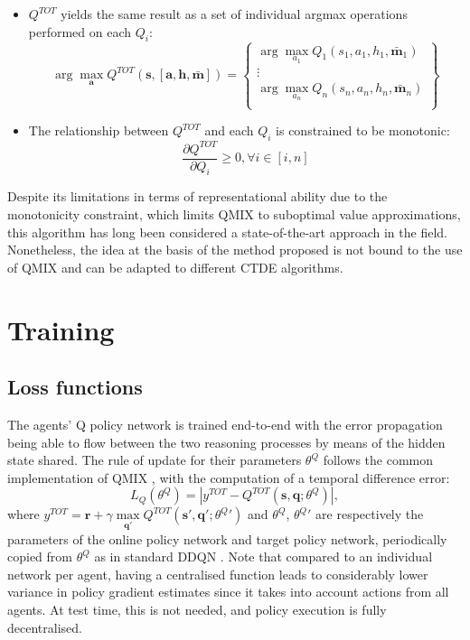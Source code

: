 \documentclass[a4paper,singleside,12pt]{report} %
\begin{document}
\begin{itemize}
\item
  \(Q^{TOT}\) yields the same result as a set of individual argmax operations performed on each \(Q_i\):
  \begin{equation}
  \arg\max_{\textbf{a}} Q^{TOT}(\textbf{s},[\textbf{a},\textbf{h},\bar{\textbf{m}}]) = \begin{Bmatrix}
  \arg\max_{a_1} Q_1(s_1,a_1,h_1,\bar{\textbf{m}}_1) \\
  \vdots\\
  \arg\max_{a_n} Q_n(s_n,a_n,h_n,\bar{\textbf{m}}_n) \\
  \end{Bmatrix}
  \end{equation}
\item
  The relationship between \(Q^{TOT}\) and each \(Q_i\) is constrained to be monotonic:
  \begin{equation}
  \frac{\partial Q^{TOT}}{\partial Q_i} \geq 0, \forall i \in [i,n]
  \end{equation}
\end{itemize}

Despite its limitations in terms of representational ability due to the monotonicity constraint, which limits QMIX to suboptimal value approximations, this algorithm has long been considered a state-of-the-art approach in the field. Nonetheless, the idea at the basis of the method proposed is not bound to the use of QMIX and can be adapted to different CTDE algorithms.

\section{Training}\label{training}

\subsection{Loss functions}\label{loss}
The agents' Q policy network is trained end-to-end with the error propagation being able to flow between the two reasoning processes by means of the hidden state shared. The rule of update for their parameters \(\theta^Q\) follows the common implementation of QMIX \cite{Rashid2018QMIXMV}, with the computation of a temporal difference error:
  \begin{equation}
    L_Q(\theta^Q) = |y^{TOT} - Q^{TOT}(\textbf{s}, \textbf{q}; \theta^Q)|,
  \end{equation}
where $y^{TOT} = \textbf{r} + \gamma \max\limits_{\textbf{q}'}Q^{TOT}(\textbf{s}', \textbf{q}'; \theta^{Q}{'})$ and \(\theta^Q\), \(\theta^{Q}{'}\) are respectively the parameters of the online policy network and target policy network, periodically copied from \(\theta^Q\) as in standard DDQN \cite{Van2016deep}. Note that compared to an individual network per agent, having a centralised function leads to considerably lower variance in policy gradient estimates since it takes into account actions from all agents. At test time, this is not needed, and policy execution is fully decentralised.
\end{document}
